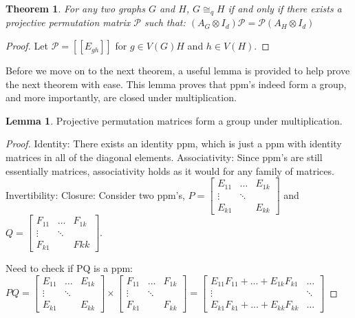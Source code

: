 \documentclass[12pt]{article}
\newtheorem{Theorem}{Theorem}
\theoremstyle{definition}
\theoremstyle{proposition}
\theoremstyle{lemma}
\newtheorem{lem}{Lemma}[section]
\begin{document}
\begin{Theorem}
For any two graphs $G$ and $H$, $G \cong_q H$ if and only if there exists a projective permutation matrix $\mathcal{P}$ such that: $(A_G \otimes I_d)\mathcal{P} = \mathcal{P} (A_H \otimes I_d)$
\end{Theorem}
\begin{proof}
Let $\mathcal{P} = [[E_{gh}]]$ for $g \in V(G)H$ and $h \in V(H)$.
\end{proof}

Before we move on to the next theorem, a useful lemma is provided to help prove the next theorem with ease. This lemma proves that ppm's indeed form a group, and more importantly, are closed under multiplication.

\begin{lem}
Projective permutation matrices form a group under multiplication.
\end{lem}
\begin{proof}
Identity: There exists an identity ppm, which is just a ppm with identity matrices in all of the diagonal elements.
Associativity: Since ppm's are still essentially matrices, associativity holds as it would for any family of matrices.
Invertibility:
Closure: Consider two ppm's, $P = \begin{bmatrix}
E_{11} & \dots & E_{1k} \\
\vdots  & \ddots \\
E_{k1} &        & E_{kk}
\end{bmatrix}$ and $Q = \begin{bmatrix}
F_{11} & \dots & F_{1k} \\
\vdots  & \ddots \\
F_{k1} &        & F{kk}
\end{bmatrix}$. 

Need to check if PQ is a ppm:
$PQ = \begin{bmatrix}
E_{11} & \dots & E_{1k} \\
\vdots  & \ddots \\
E_{k1} &        & E_{kk}
\end{bmatrix}
\times
\begin{bmatrix}
F_{11} & \dots & F_{1k} \\
\vdots  & \ddots \\
F_{k1} &        & F_{kk}
\end{bmatrix}
= 
\begin{bmatrix}
E_{11}F_{11} + ... + E_{1k}F_{k1} & \dots  \\
\vdots  & \ddots \\
E_{k1}F_{k1} + ... + E_{kk}F_{kk} & \dots
\end{bmatrix}
$
\end{proof}
\end{document}
